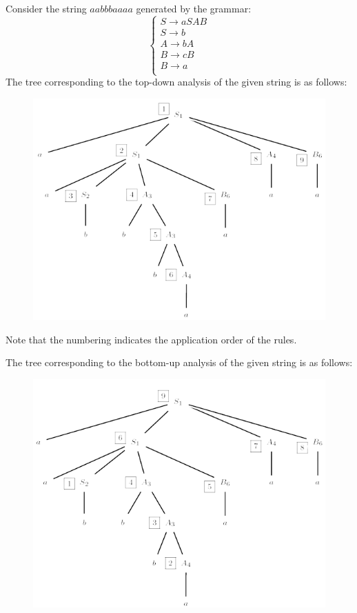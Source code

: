 \begin{example}
    Consider the string $aabbbaaaa$ generated by the grammar: 
    \[
    \begin{cases}
        S \rightarrow aSAB \\
        S \rightarrow b \\
        A \rightarrow bA \\
        B \rightarrow cB \\
        B \rightarrow a \\
    \end{cases}    
    \]
    The tree corresponding to the top-down analysis of the given string is as follows: 
    \begin{figure}[H]
        \centering
        \includegraphics[width=0.5\linewidth]{images/tda.png}
    \end{figure}
    Note that the numbering indicates the application order of the rules.

    The tree corresponding to the bottom-up analysis of the given string is as follows: 
    \begin{figure}[H]
        \centering
        \includegraphics[width=0.5\linewidth]{images/bua.png}
    \end{figure}
\end{example}